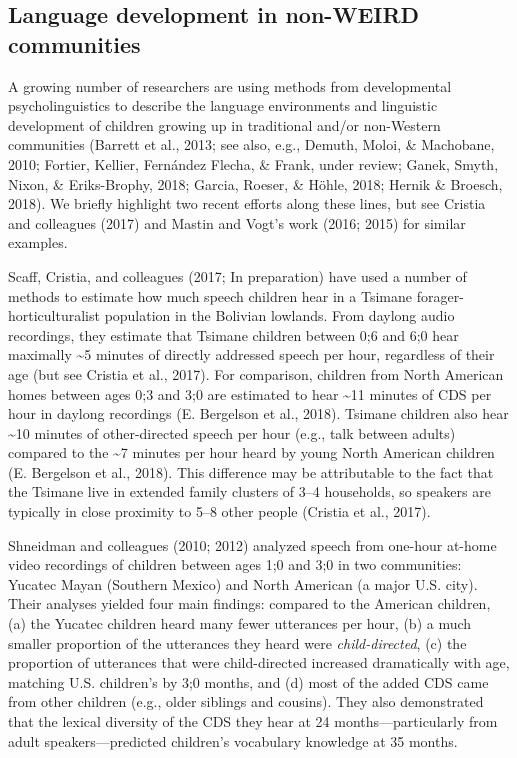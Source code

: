 \documentclass[floatsintext,man]{apa6}
\theoremstyle{definition}
\theoremstyle{definition}
\theoremstyle{definition}
\theoremstyle{remark}
\begin{document}
\subsection{Language development in non-WEIRD
communities}\label{intro-nonweird}

A growing number of researchers are using methods from developmental
psycholinguistics to describe the language environments and linguistic
development of children growing up in traditional and/or non-Western
communities (Barrett et al., 2013; see also, e.g., Demuth, Moloi, \&
Machobane, 2010; Fortier, Kellier, Fernández Flecha, \& Frank, under
review; Ganek, Smyth, Nixon, \& Eriks-Brophy, 2018; Garcia, Roeser, \&
Höhle, 2018; Hernik \& Broesch, 2018). We briefly highlight two recent
efforts along these lines, but see Cristia and colleagues (2017) and
Mastin and Vogt's work (2016; 2015) for similar examples.

Scaff, Cristia, and colleagues (2017; In preparation) have used a number
of methods to estimate how much speech children hear in a Tsimane
forager-horticulturalist population in the Bolivian lowlands. From
daylong audio recordings, they estimate that Tsimane children between
0;6 and 6;0 hear maximally \textasciitilde{}5 minutes of directly
addressed speech per hour, regardless of their age (but see Cristia et
al., 2017). For comparison, children from North American homes between
ages 0;3 and 3;0 are estimated to hear \textasciitilde{}11 minutes of
CDS per hour in daylong recordings (E. Bergelson et al., 2018). Tsimane
children also hear \textasciitilde{}10 minutes of other-directed speech
per hour (e.g., talk between adults) compared to the \textasciitilde{}7
minutes per hour heard by young North American children (E. Bergelson et
al., 2018). This difference may be attributable to the fact that the
Tsimane live in extended family clusters of 3--4 households, so speakers
are typically in close proximity to 5--8 other people (Cristia et al.,
2017).

Shneidman and colleagues (2010; 2012) analyzed speech from one-hour
at-home video recordings of children between ages 1;0 and 3;0 in two
communities: Yucatec Mayan (Southern Mexico) and North American (a major
U.S. city). Their analyses yielded four main findings: compared to the
American children, (a) the Yucatec children heard many fewer utterances
per hour, (b) a much smaller proportion of the utterances they heard
were \emph{child-directed}, (c) the proportion of utterances that were
child-directed increased dramatically with age, matching U.S. children's
by 3;0 months, and (d) most of the added CDS came from other children
(e.g., older siblings and cousins). They also demonstrated that the
lexical diversity of the CDS they hear at 24 months---particularly from
adult speakers---predicted children's vocabulary knowledge at 35 months.
\end{document}
